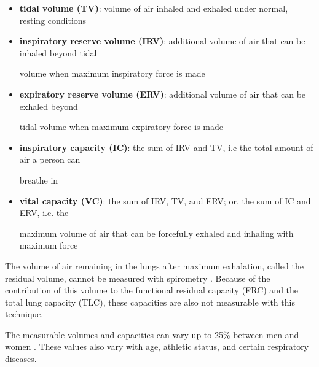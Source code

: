 \documentclass{article}
\begin{document}
\begin{itemize}
\item \textbf{tidal volume (TV)}: volume of air inhaled and exhaled under normal, resting conditions


\item \textbf{inspiratory reserve volume (IRV)}: additional volume of air that can be inhaled beyond tidal

volume when maximum inspiratory force is made


\item \textbf{expiratory reserve volume (ERV)}: additional volume of air that can be exhaled beyond

tidal volume when maximum expiratory force is made


\item \textbf{inspiratory capacity (IC)}: the sum of IRV and TV, i.e the total amount of air a person can

breathe in


\item \textbf{vital capacity (VC)}: the sum of IRV, TV, and ERV; or, the sum of IC and ERV, i.e. the

maximum volume of air that can be forcefully exhaled and inhaling with maximum force
\end{itemize}

The volume of air remaining in the lungs after maximum exhalation, called the residual volume, cannot be measured with spirometry \citep{guyton2016book}. Because of the contribution of this volume to the functional residual capacity (FRC) and the total lung capacity (TLC), these capacities are also not measurable with this technique.

The measurable volumes and capacities can vary up to 25\% between men and women \citep{guyton2016book}. These values also vary with age, athletic status, and certain respiratory diseases.
\end{document}
